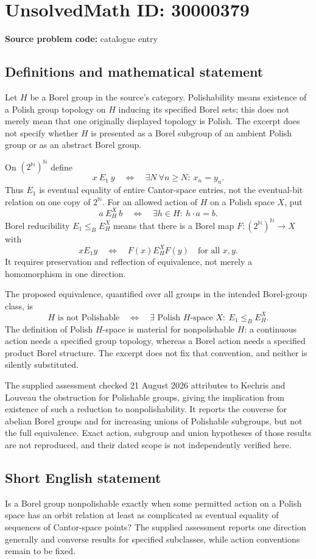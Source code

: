 \documentclass[11pt]{article}
\newcommand{\N}{\mathbb{N}}
\begin{document}
\section*{UnsolvedMath ID: 30000379}
\textbf{Source problem code:} catalogue entry
\subsection{Definitions and mathematical statement}
Let $H$ be a Borel group in the source's category. Polishability means existence of a Polish group topology on $H$ inducing its specified Borel sets; this does not merely mean that one originally displayed topology is Polish. The excerpt does not specify whether $H$ is presented as a Borel subgroup of an ambient Polish group or as an abstract Borel group.

On $(2^{\N})^{\N}$ define
\[
 x\ E_1\ y\quad\Longleftrightarrow\quad
 \exists N\ \forall n\geq N:\ x_n=y_n.
\]
Thus $E_1$ is eventual equality of entire Cantor-space entries, not the eventual-bit relation on one copy of $2^{\N}$. For an allowed action of $H$ on a Polish space $X$, put
\[
 a\ E_H^X\ b\quad\Longleftrightarrow\quad
 \exists h\in H:\ h\cdot a=b.
\]
Borel reducibility $E_1\leq_B E_H^X$ means that there is a Borel map $F:(2^{\N})^{\N}\to X$ with
\[
 xE_1y\quad\Longleftrightarrow\quad F(x)E_H^XF(y)
 \quad\text{for all }x,y.
\]
It requires preservation and reflection of equivalence, not merely a homomorphism in one direction.

The proposed equivalence, quantified over all groups in the intended Borel-group class, is
\[
 H\text{ is not Polishable}\quad\Longleftrightarrow\quad
 \exists\text{ Polish }H\text{-space }X:\ E_1\leq_B E_H^X.
\]
The definition of Polish $H$-space is material for nonpolishable $H$: a continuous action needs a specified group topology, whereas a Borel action needs a specified product Borel structure. The excerpt does not fix that convention, and neither is silently substituted.

The supplied assessment checked 21 August 2026 attributes to Kechris and Louveau the obstruction for Polishable groups, giving the implication from existence of such a reduction to nonpolishability. It reports the converse for abelian Borel groups and for increasing unions of Polishable subgroups, but not the full equivalence. Exact action, subgroup and union hypotheses of those results are not reproduced, and their dated scope is not independently verified here.
\subsection{Short English statement}
Is a Borel group nonpolishable exactly when some permitted action on a Polish space has an orbit relation at least as complicated as eventual equality of sequences of Cantor-space points? The supplied assessment reports one direction generally and converse results for specified subclasses, while action conventions remain to be fixed.
\end{document}
